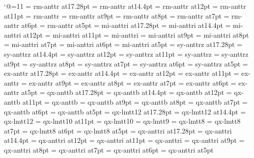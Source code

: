 \catcode`@=11
\font\seventeenrm=  rm-anttr at17.28pt
\font\fourteenrm=   rm-anttr at14.4pt
\font\twelverm=     rm-anttr at12pt
\font\elevenrm=     rm-anttr at11pt
\font\tenrm=        rm-anttr
\font\ninerm=       rm-anttr at9pt
\font\eightrm=      rm-anttr at8pt
\font\sevenrm=      rm-anttr at7pt
\font\sixrm=        rm-anttr at6pt
\font\fiverm=       rm-anttr at5pt
\font\seventeeni=   mi-anttri at17.28pt
\font\fourteeni=    mi-anttri at14.4pt
\font\twelvei=      mi-anttri at12pt
\font\eleveni=      mi-anttri at11pt
\font\teni=         mi-anttri
\font\ninei=        mi-anttri at9pt
\font\eighti=       mi-anttri at8pt
\font\seveni=       mi-anttri at7pt
\font\sixi=         mi-anttri at6pt
\font\fivei=        mi-anttri at5pt
\font\seventeensy=  sy-anttrz at17.28pt
\font\fourteensy=   sy-anttrz at14.4pt
\font\twelvesy=     sy-anttrz at12pt
\font\elevensy=     sy-anttrz at11pt
\font\tensy=        sy-anttrz
\font\ninesy=       sy-anttrz at9pt
\font\eightsy=      sy-anttrz at8pt
\font\sevensy=      sy-anttrz at7pt
\font\sixsy=        sy-anttrz at6pt
\font\fivesy=       sy-anttrz at5pt
\font\seventeenex=  ex-anttr at17.28pt
\font\fourteenex=   ex-anttr at14.4pt
\font\twelveex=     ex-anttr at12pt
\font\elevenex=     ex-anttr at11pt
\font\tenex=        ex-anttr
\font\nineex=       ex-anttr at9pt
\font\eightex=      ex-anttr at8pt
\font\sevenex=      ex-anttr at7pt
\font\sixex=        ex-anttr at6pt
\font\fiveex=       ex-anttr at5pt
\font\seventeenbf=  qx-anttb at17.28pt
\font\fourteenbf=   qx-anttb at14.4pt
\font\twelvebf=     qx-anttb at12pt
\font\elevenbf=     qx-anttb at11pt
\font\tenbf=        qx-anttb
\font\ninebf=       qx-anttb at9pt
\font\eightbf=      qx-anttb at8pt
\font\sevenbf=      qx-anttb at7pt
\font\sixbf=        qx-anttb at6pt
\font\fivebf=       qx-anttb at5pt
\font\seventeentt=  qx-lmtt12 at17.28pt
\font\fourteentt=   qx-lmtt12 at14.4pt
\font\twelvett=     qx-lmtt12
\font\eleventt=     qx-lmtt10 at11pt
\font\tentt=        qx-lmtt10
\font\ninett=       qx-lmtt9
\font\eighttt=      qx-lmtt8
\font\seventt=      qx-lmtt8 at7pt
\font\sixtt=        qx-lmtt8 at6pt
\font\fivett=       qx-lmtt8 at5pt
\font\seventeenit=  qx-anttri at17.28pt
\font\fourteenit=   qx-anttri at14.4pt
\font\twelveit=     qx-anttri at12pt
\font\elevenit=     qx-anttri at11pt
\font\tenit=        qx-anttri
\font\nineit=       qx-anttri at9pt
\font\eightit=      qx-anttri at8pt
\font\sevenit=      qx-anttri at7pt
\font\sixit=        qx-anttri at6pt
\font\fiveit=       qx-anttri at5pt
%
